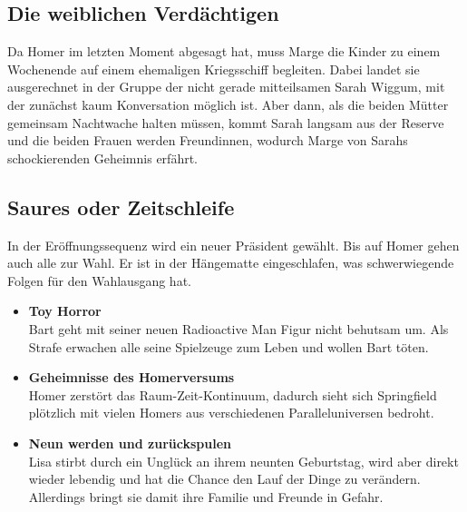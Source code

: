 \subsection{Die weiblichen Verdächtigen}\label{QABF10}
Da Homer im letzten Moment abgesagt hat, muss Marge die Kinder zu einem Wochenende auf einem ehemaligen Kriegsschiff begleiten. Dabei landet sie ausgerechnet in der Gruppe der nicht gerade mitteilsamen Sarah Wiggum, mit der zunächst kaum Konversation möglich ist. Aber dann, als die beiden Mütter gemeinsam Nachtwache halten müssen, kommt Sarah langsam aus der Reserve und die beiden Frauen werden Freundinnen, wodurch Marge von Sarahs schockierenden Geheimnis erfährt. 


\subsection{Saures oder Zeitschleife}
In der Eröffnungssequenz wird ein neuer Präsident gewählt. Bis auf Homer gehen auch alle zur Wahl. Er ist in der Hängematte eingeschlafen, was schwerwiegende Folgen für den Wahlausgang hat.
\begin{itemize}
  \item \textbf{Toy Horror}\\ Bart geht mit seiner neuen Radioactive Man Figur nicht behutsam um. Als Strafe erwachen alle seine Spielzeuge zum Leben und wollen Bart töten.
  \item \textbf{Geheimnisse des Homerversums}\\ Homer zerstört das Raum-Zeit-Kontinuum, dadurch sieht sich Springfield plötzlich mit vielen Homers aus verschiedenen Paralleluniversen bedroht.
  \item \textbf{Neun werden und zurückspulen}\\ Lisa stirbt durch ein Unglück an ihrem neunten Geburtstag, wird aber direkt wieder lebendig und hat die Chance den Lauf der Dinge zu verändern. Allerdings bringt sie damit ihre Familie und Freunde in Gefahr.
\end{itemize}

